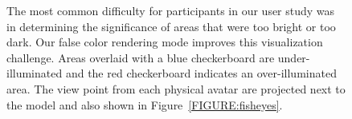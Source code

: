 \documentclass[10pt,twocolumn,letterpaper]{article}
\begin{document}
\begin{figure}[t]
\begin{center}
\end{center}
\vspace{-0.1in}
\caption{The most common difficulty for participants in our user study
  was in determining the significance of areas that were too bright or
  too dark.  Our false color rendering mode improves this visualization challenge.
Areas overlaid with a blue checkerboard are
  under-illuminated and the red checkerboard indicates an
  over-illuminated area.  The view point from each physical avatar are projected next to the model and also
  shown in Figure~\ref{FIGURE:fisheyes}.}
\label{FIGURE:office_false_color}
\end{figure}
\end{document}
